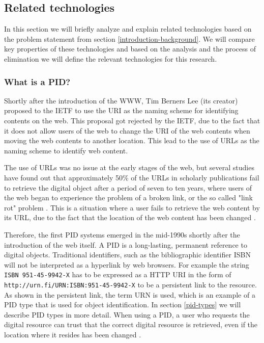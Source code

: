 \subsection{Related technologies}
In this section we will briefly analyze and explain related technologies based on the problem statement from section \ref{introduction-background}. We will compare key properties of these technologies and based on the analysis and the process of elimination we will define the relevant technologies for this research.

\subsubsection{What is a PID?}\label{pid-intr}
Shortly after the introduction of the WWW, Tim Berners Lee (its creator) proposed to the IETF to use the URI as the naming scheme for identifying contents on the web. This proposal got rejected by the IETF, due to the fact that it does not allow users of the web to change the URI of the web contents when moving the web contents to another location. This lead to the use of URLs as the naming scheme to identify web content. 
 
The use of URLs was no issue at the early stages of the web, but several studies have found out that approximately 50\% of the URLs in scholarly publications fail to retrieve the digital object after a period of seven to ten years, where users of the web began to experience the problem of a broken link, or the so called "link rot" problem \cite{rot-link1, rot-link2}. This is a situation where a user fails to retrieve the web content by its URL, due to the fact that the location of the web content has been changed \cite{icn-bd, ark-id}. 

Therefore, the first PID systems emerged in the mid-1990s shortly after the introduction of the web itself. A PID is a long-lasting, permanent reference to digital objects. Traditional identifiers, such as the bibliographic identifier ISBN will not be interpreted as a hyperlink by web browsers. For example the string \texttt{ISBN 951-45-9942-X} has to be expressed as a HTTP URI in the form of \texttt{http://urn.fi/URN:ISBN:951-45-9942-X} to be a persistent link to the resource. As shown in the persistent link, the term URN is used, which is an example of a PID type that is used for object identification. In section \ref{pid-types} we will describe PID types in more detail. When using a PID, a user who requests the digital resource can trust that the correct digital resource is retrieved, even if the location where it resides has been changed \cite{pid-oview}.

